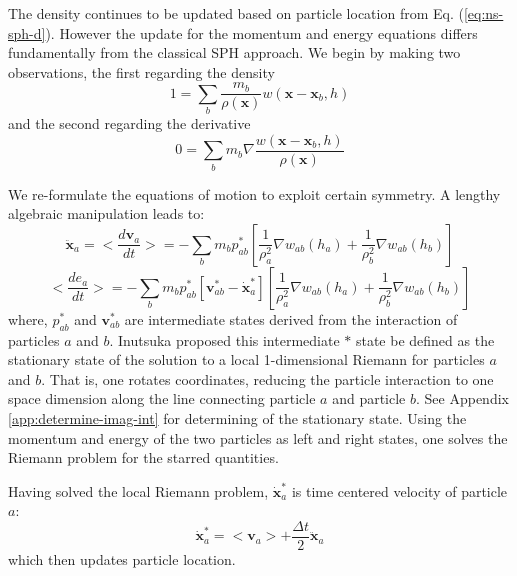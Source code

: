 The density continues to be updated based on particle location from Eq. (\ref{eq:ns-sph-d}). However the update for the momentum and energy equations differs fundamentally from the classical SPH approach. We begin by making two observations, the first regarding the density
\begin{equation}
1=\sum_{b} \frac{m_{b}}{\rho(\textbf{x})}w(\textbf{x} - \textbf{x}_{b}, h)
\label{eq:GSPH-basic1}
\end{equation}
and the second regarding the derivative 
\begin{equation}
0=\sum_{b} m_{b} \nabla \frac{w(\textbf{x} - \textbf{x}_{b}, h)}{\rho(\textbf{x})}
\label{eq:GSPH-basic2}
\end{equation}

We re-formulate the equations of motion to exploit certain symmetry. A lengthy algebraic manipulation \citep{inutsuka2002reformulation,iwasaki2011smoothed} leads to:
\begin{equation}
\ddot{\textbf{x}}_{a} = <\dfrac{d \textbf{v}_{a}}{dt}>= -\sum_{b} m_{b} p_{a b}^{\ast} \left[\frac{1}{\rho_{a}^2} \nabla w_{a b}(h_{a}) + \frac{1}{\rho_{b}^2} \nabla w_{a b}(h_{b}) \right]
\label{eq:gov-gsph-v-simple-form}
\end{equation}
\begin{equation}
<\dfrac{d e_{a}}{dt}>= - \sum_{b} m_{b} p_{a b}^{\ast} [\textbf{v}_{a b}^{\ast} - \dot{\textbf{x}}_{a}^{\ast}] \left[\frac{1}{\rho_{a}^2} \nabla w_{a b}(h_{a}) + \frac{1}{\rho_{b}^2} \nabla w_{a b}(h_{b}) \right]
\label{eq:gov-gsph-e-simple-form}
\end{equation}
where, $p_{a b}^{\ast}$ and $\textbf{v}_{a b}^{\ast}$ are intermediate states derived from the interaction of particles $a$ and $b$. Inutsuka proposed this intermediate $\ast$ state be defined as the stationary state of the solution to a local 1-dimensional Riemann for particles $a$ and $b$. That is, one rotates coordinates, reducing the particle interaction to one space dimension along the line connecting particle $a$ and particle $b$. See Appendix \ref{app:determine-imag-int} for determining of the stationary state. Using the momentum and energy of the two particles as left and right states, one solves the Riemann problem for the starred quantities.

Having solved the local Riemann problem, 
$\dot{\textbf{x}}_{a}^{\ast}$ is time centered velocity of particle $a$:
\begin{equation}
\dot{\textbf{x}}_{a}^{\ast} = <\textbf{v}_{a}> + \frac{\Delta t}{2} \ddot{\textbf{x}}_{a}
\label{eq:gsph-time-centered-velocity}
\end{equation}
which then updates particle location.

